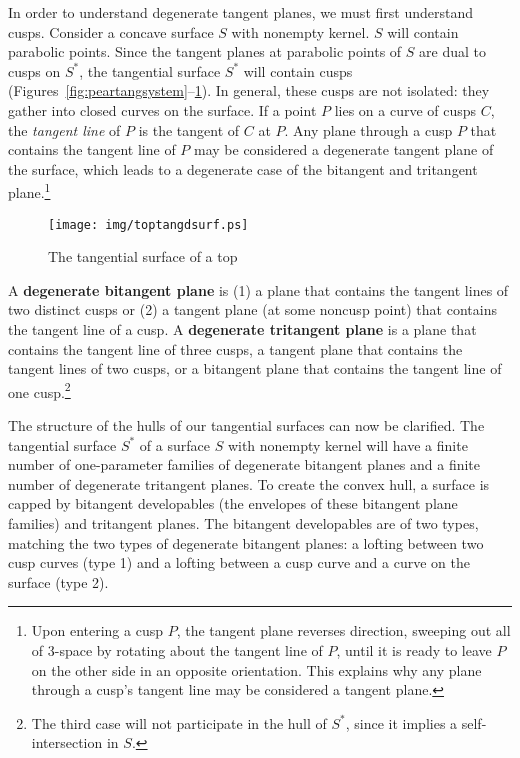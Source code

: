 \documentclass{elsart}
\begin{document}
In order to understand degenerate tangent planes, we must first understand cusps.
Consider a concave
surface $S$ with nonempty kernel.
$S$ will contain parabolic points.
Since the tangent planes at parabolic points of $S$ are dual to cusps on $S^*$,
the tangential surface $S^*$ will contain cusps 
(Figures~\ref{fig:peartangsystem}--\ref{fig:toptangdsurf}).
In general, these cusps are not isolated: they gather into closed curves on the surface.
If a point $P$ lies on a curve of cusps $C$,
the {\em tangent line} of $P$ is the tangent of $C$ at $P$.
Any plane through a cusp $P$ that contains the tangent line of $P$ may be considered
a degenerate tangent plane of the surface,
which leads to a degenerate case of the bitangent and tritangent plane.\footnote{Upon entering a cusp $P$, 
	the tangent plane reverses direction, sweeping out all of 3-space 
	by rotating about the tangent line of $P$,
	until it is ready to leave $P$ on the other side in an opposite orientation.
        This explains why any plane through a cusp's tangent line may be considered a tangent plane.}

\begin{figure}
\begin{center}
\texttt{[image: img/toptangdsurf.ps]}
\end{center}
\caption{The tangential surface of a top}
\label{fig:toptangdsurf}
\vskip 0.37in
\end{figure}

\begin{defn2}
A {\bf degenerate bitangent plane} is 
(1) a plane that contains the tangent lines of two distinct cusps or
(2) a tangent plane (at some noncusp point) that contains the tangent line of a cusp. 
A {\bf degenerate tritangent plane} is 
a plane that contains the tangent line of three cusps, 
a tangent plane that contains the tangent lines of two cusps,
or a bitangent plane that contains the tangent line of one cusp.\footnote{The
	third case will not participate in the hull of $S^*$, since
	it implies a self-intersection in $S$.}
\end{defn2}

The structure of the hulls of our tangential surfaces can now be clarified.
The tangential surface $S^*$ of a surface $S$ with nonempty kernel 
will have a finite number of one-parameter families of degenerate bitangent planes
and a finite number of degenerate tritangent planes.
To create the convex hull, a surface is capped by bitangent developables
(the envelopes of these bitangent plane families) and tritangent planes.
The bitangent developables
are of two types, matching the two types of degenerate bitangent planes: 
a lofting between two cusp curves (type 1) and
a lofting between a cusp curve and a curve on the surface (type 2).
\end{document}
